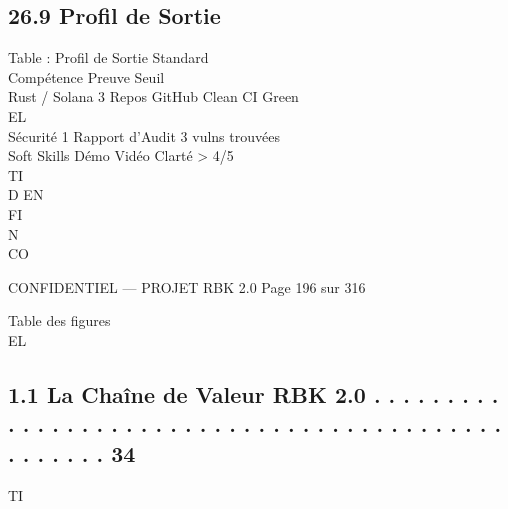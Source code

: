 \subsection{26.9 Profil de Sortie}
Table : Profil de Sortie Standard\\
Compétence Preuve                  Seuil\\
Rust / Solana 3 Repos GitHub Clean CI Green\\
\vspace{0.5em}
\vspace{0.5em}
\vspace{0.5em}
\vspace{0.5em}
EL\\
Sécurité      1 Rapport d’Audit    3 vulns trouvées\\
Soft Skills   Démo Vidéo           Clarté \textgreater{} 4/5\\
\vspace{0.5em}
\vspace{0.5em}
\vspace{0.5em}
\vspace{0.5em}
TI\\
D    EN\\
FI\\
N\\
CO\\
\vspace{0.5em}
\vspace{0.5em}
\vspace{0.5em}
\vspace{0.5em}
\begin{confidential}CONFIDENTIEL — PROJET RBK 2.0                               Page 196 sur 316\end{confidential}
Table des figures\\
\vspace{0.5em}
\vspace{0.5em}
\vspace{0.5em}
\vspace{0.5em}
EL\\
\subsection{1.1 La Chaîne de Valeur RBK 2.0 . . . . . . . . . . . . . . . . . . . . . . . . . . . . . . . . . . . . . . . . . . . . . . . . . .     34}
\vspace{0.5em}
\vspace{0.5em}
\vspace{0.5em}
\vspace{0.5em}
TI\\
